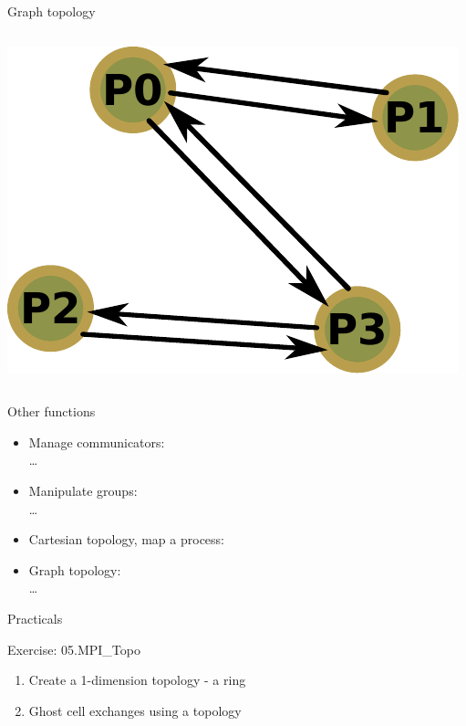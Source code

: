 \documentclass[aspectratio=43]{beamer}
\begin{document}
\begin{frame}[fragile]{Graph topology}
\begin{columns}
    \begin{column}{0.2\paperwidth}
\includegraphics[scale=0.36]{05.MPI_Topo/graph.pdf}
    \end{column}
\end{columns}

\end{frame}


\begin{frame}[fragile]{Other functions}
\begin{itemize}
    \item Manage communicators:\\\hspace{1cm} \ldots
    \item Manipulate groups:\\\hspace{1cm} \ldots
        \item Cartesian topology, map a process:\\\hspace{1cm}
        \item Graph topology:\\\hspace{1cm} \ldots
\end{itemize}
\end{frame}


\begin{frame}{Practicals}
    \begin{brown2block}{Exercise: 05.MPI\_Topo}
    \begin{enumerate}
        \item Create a 1-dimension topology - a ring
        \item Ghost cell exchanges using a topology
    \end{enumerate}
    \end{brown2block}
\end{frame}




\end{document}
